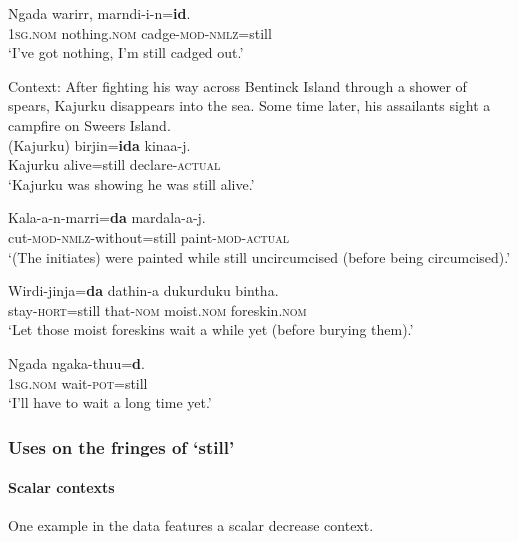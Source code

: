 \begin{exe}
	\ex\label{exAppendixKayardild1}
	\gll Ngada warirr, marndi-i-n=\textbf{id}.\\
	1\textsc{sg}.\textsc{nom} nothing.\textsc{nom} cadge-\textsc{mod}-\textsc{nmlz}=still\\
	\glt \lq I’ve got nothing, I’m still cadged out.' \parencite[391]{Evans1995}
	
	\ex\label{exAppendixKayardild2} 
	Context:  After fighting his way across Bentinck Island through a shower of spears, Kajurku disappears into the sea. Some time later, his assailants sight a campfire on Sweers Island.\\
	\gll (Kajurku) birjin=\textbf{ida} kinaa-j.\\
	\phantom{(}Kajurku alive=still declare-\textsc{actual}\\
	\glt \lq Kajurku was showing he was still alive.' \parencite[327]{Evans1995}

	\ex\label{exAppendixKayardild3}
	\gll Kala-a-n-marri=\textbf{da} mardala-a-j.\\
	cut-\textsc{mod}-\textsc{nmlz}-without=still paint-\textsc{mod}-\textsc{actual}\\
	\glt \lq (The initiates) were painted while still uncircumcised (before being circumcised).' \parencite[391]{Evans1995}
	
	\ex\label{exAppendixKayardild4}
	\gll Wirdi-jinja=\textbf{da} dathin-a dukurduku bintha.\\
	stay-\textsc{hort}=still that-\textsc{nom} moist.\textsc{nom} foreskin.\textsc{nom}\\
	\glt \lq Let those moist foreskins wait a while yet (before burying them).\rq{ }\parencite[264]{Evans1995}
	
	\ex\label{exAppendixKayardild5}
	\gll Ngada ngaka-thuu=\textbf{d}.\\
	1\textsc{sg}.\textsc{nom} wait-\textsc{pot}=still\\
	\glt \lq I'll have to wait a long time yet.\rq{ }\parencite[392]{Evans1995}	
\end{exe}


\subsubsection{Uses on the fringes of \lq{}still\rq{}}

\paragraph{Scalar contexts}\label{appendixKayardildScalar}
\begin{itemize}
	\ex One example in the data features a scalar decrease context.
\end{itemize}

